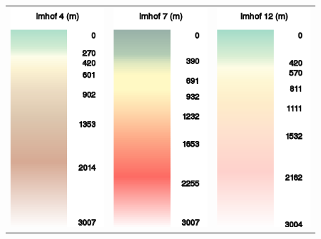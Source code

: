 \documentclass[a4paper,12pt]{refrep}
\begin{document}
\begin{maxipage}
\begin{longtable}{c c c}
\includegraphics[angle=0,width=3.5cm,keepaspectratio='true']{figures/ramp-terrain-imhof4.png}&
\includegraphics[angle=0,width=3.5cm,keepaspectratio='true']{figures/ramp-terrain-imhof7.png}&
\includegraphics[angle=0,width=3.5cm,keepaspectratio='true']{figures/ramp-terrain-imhof12.png}\\
\end{longtable}
\end{maxipage}
\end{document}
